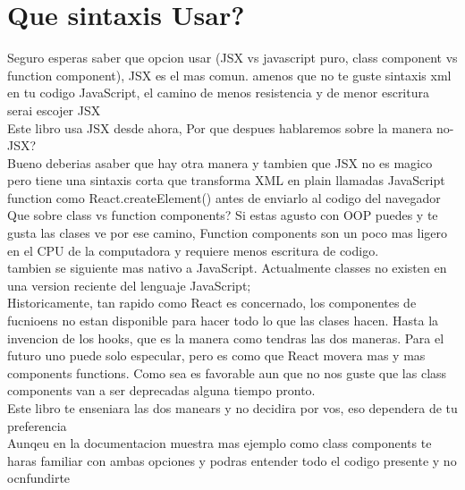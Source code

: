 \section{Que sintaxis Usar?}
Seguro esperas saber que opcion usar (JSX vs javascript puro, class component vs function component), JSX es el mas comun. amenos que no te guste sintaxis xml en tu codigo JavaScript, el camino de menos resistencia y de menor escritura serai escojer JSX\\
Este libro usa JSX desde ahora, Por que despues hablaremos sobre la manera no-JSX?\\
Bueno deberias asaber que hay otra manera y tambien que JSX no es magico pero tiene una sintaxis corta que transforma XML en plain llamadas JavaScript function como React.createElement() antes de enviarlo al codigo del navegador\\
Que sobre class vs function components? Si estas agusto con OOP puedes y te gusta las clases ve por ese camino, Function components son un poco mas ligero en el CPU de la computadora y requiere menos escritura de codigo.\\
tambien se siguiente mas nativo a JavaScript. Actualmente classes no existen en una version reciente del lenguaje JavaScript; \\
Historicamente, tan rapido como React es concernado, los componentes de fucnioens no estan disponible para hacer todo lo que las clases hacen. Hasta la invencion de los hooks, que es la manera como tendras las dos maneras. Para el futuro uno puede solo especular, pero es como que React movera mas y mas components functions. Como sea es favorable aun que no nos guste que las class components van a ser deprecadas alguna tiempo pronto.\\
Este libro te enseniara las dos manears y no decidira por vos, eso dependera de tu preferencia \\
Aunqeu en la documentacion muestra mas ejemplo como class components te haras familiar con ambas opciones y podras entender todo el codigo presente y no ocnfundirte\\

